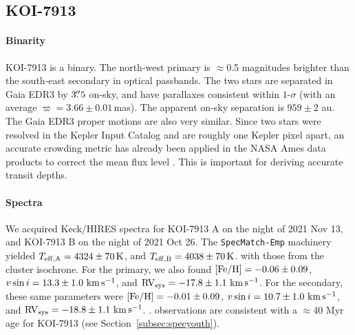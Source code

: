 \documentclass[12pt,twocolumn,tighten,linenumbers,trackchanges]{aastex63}
\newcommand{\mkms}{{\rm \,km\,s^{-1}}}  %
\begin{document}
\subsection{KOI-7913}
\label{subsec:koi7913}

\paragraph{Binarity}
KOI-7913 is a binary.  The north-west primary is
$\approx$0.5 magnitudes brighter than the south-east secondary in
optical passbands.  The two stars are separated in Gaia EDR3 by
$3\mbox{$.\!\!^{\prime\prime}$}5$ on-sky, and have parallaxes consistent within $1$-$\sigma$
(with an average $\varpi=3.66 \pm 0.01$\,mas).  The apparent on-sky
separation is $959 \pm 2$ au.  The Gaia EDR3 proper motions are also
very similar.  Since two stars were resolved in the Kepler Input
Catalog and are roughly one Kepler pixel apart, an accurate crowding
metric has already been applied in the NASA Ames data products to
correct the mean flux level \citep{2017ksci.rept....6M}.  This is
important for deriving accurate transit depths.

\paragraph{Spectra}
We acquired Keck/HIRES spectra for KOI-7913 A on the night of 2021 Nov
13, and KOI-7913 B on the night of 2021 Oct 26.  The
\texttt{SpecMatch-Emp} machinery yielded $T_{\rm eff,A} = 4324 \pm
70\,{\rm K}$, and $T_{\rm eff,B} = 4038 \pm 70\,{\rm K}$.   with those from the cluster
isochrone.  For the primary, we also found $[{\rm Fe/H}]= -0.06 \pm
0.09$, $v\sin i = 13.3 \pm 1.0\,\mkms$, and ${\rm RV}_{\rm sys} =
-17.8 \pm 1.1\,\mkms$.  For the secondary, these same parameters were
$[{\rm Fe/H}]= -0.01 \pm 0.09$, $v\sin i = 10.7 \pm 1.0\,\mkms$, and
${\rm RV}_{\rm sys} = -18.8 \pm 1.1\,\mkms$.  .   observations
are consistent with a $\approx$40 Myr age for KOI-7913 (see
Section~\ref{subsec:specyouth}).
\end{document}
